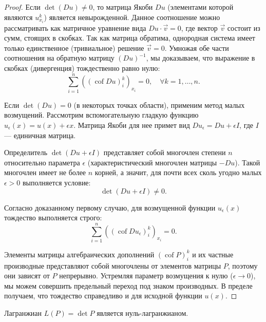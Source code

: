 \begin{proof}
Если $\det(Du) \neq 0$, то матрица Якоби $Du$ (элементами которой являются $u^k_{x_i}$) является невырожденной. Данное соотношение можно рассматривать как матричное уравнение вида $Du \cdot \vec{v} = 0$, где вектор $\vec{v}$ состоит из сумм, стоящих в скобках. Так как матрица обратима, однородная система имеет только единственное (тривиальное) решение $\vec{v} = 0$. Умножая обе части соотношения на обратную матрицу $(Du)^{-1}$, мы доказываем, что выражение в скобках (дивергенция) тождественно равно нулю:
\begin{equation}
    \sum_{i=1}^n ((\operatorname{cof} Du)_i^k)_{x_i} = 0, \quad \forall k = 1, \dots, n.
\end{equation}

Если $\det(Du) = 0$ (в некоторых точках области), применим метод малых возмущений. Рассмотрим вспомогательную гладкую функцию $u_\epsilon(x) = u(x) + \epsilon x$. Матрица Якоби для нее примет вид $Du_\epsilon = Du + \epsilon I$, где $I$ --- единичная матрица.

Определитель $\det(Du + \epsilon I)$ представляет собой многочлен степени $n$ относительно параметра $\epsilon$ (характеристический многочлен матрицы $-Du$). Такой многочлен имеет не более $n$ корней, а значит, для почти всех сколь угодно малых $\epsilon > 0$ выполняется условие:
\begin{equation}
    \det(Du + \epsilon I) \neq 0.
\end{equation}

Согласно доказанному первому случаю, для возмущенной функции $u_\epsilon(x)$ тождество выполняется строго:
\begin{equation}
    \sum_{i=1}^n ((\operatorname{cof} Du_\epsilon)_i^k)_{x_i} = 0.
\end{equation}

Элементы матрицы алгебраических дополнений $(\operatorname{cof} P)_i^k$ и их частные производные представляют собой многочлены от элементов матрицы $P$, поэтому они зависят от $P$ непрерывно. Устремляя параметр возмущения к нулю ($\epsilon \to 0$), мы можем совершить предельный переход под знаком производных. В пределе получаем, что тождество справедливо и для исходной функции $u(x)$.
\end{proof}

\begin{theorem}
    Лагранжиан $L(P) = \det P$ является нуль-лагранжианом.
\end{theorem}

